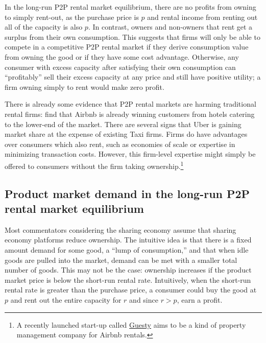 \documentclass[11pt]{article}
\begin{document}
In the long-run P2P rental market equilibrium, there are no profits from owning to simply rent-out, as the purchase price is $p$ and rental income from renting out all of the capacity is also $p$.  
In contrast, owners and non-owners that rent get a surplus from their own consumption. 
This suggests that firms will only be able to compete in a competitive P2P rental market if they derive consumption value from owning the good or if they have some cost advantage.
Otherwise, any consumer with excess capacity after satisfying their own consumption can ``profitably'' sell their excess capacity at any price and still have positive utility; a firm owning simply to rent would make zero profit.

There is already some evidence that P2P rental markets are harming traditional rental firms: 
\cite{byers2013rise} find that Airbnb is already winning customers from hotels catering to the lower-end of the market.
There are several signs that Uber is gaining market share at the expense of existing Taxi firms. 
Firms do have advantages over consumers which also rent, such as economies of scale or expertise in minimizing transaction costs. 
However, this firm-level expertise might simply be offered to consumers without the firm taking ownership.\footnote{
  A recently launched start-up called \href{https://www.guesty.com/}{Guesty} aims to be a kind of property management company for Airbnb rentals.
} 

\subsection{Product market demand in the long-run P2P rental market equilibrium} 

Most commentators considering the sharing economy assume that sharing economy platforms reduce ownership. 
The intuitive idea is that there is a fixed amount demand for some good, a ``lump of consumption,'' and that when idle goods are pulled into the market, demand can be met with a smaller total number of goods.
This may not be the case:  
ownership increases if the product market price is below the short-run rental rate.
Intuitively, when the short-run rental rate is greater than the purchase price, a consumer could buy the good at $p$ and rent out the entire capacity for $r$ and since $r > p$, earn a profit.
\end{document}
